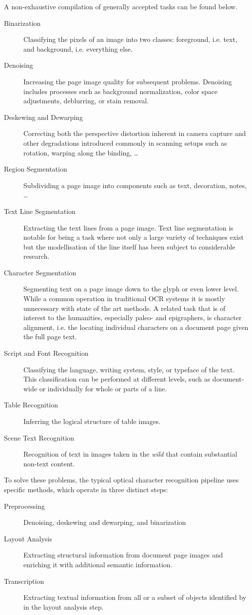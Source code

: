 A non-exhaustive compilation of generally accepted tasks can be found below.

\begin{description}
\item [Binarization] Classifying the pixels of an image into two classes:
foreground, i.e. text, and background, i.e. everything else.
\item [Denoising] Increasing the page image quality for subsequent problems.
Denoising includes processes such as background normalization, color space
adjustments, deblurring, or stain removal.
\item [Deskewing and Dewarping] Correcting both the perspective distortion
inherent in camera capture and other degradations introduced commonly in
scanning setups such as rotation, warping along the binding, \dots
\item [Region Segmentation] Subdividing a page image into components such as text, decoration, notes, \dots
\item [Text Line Segmentation] Extracting the text lines from a page image.
Text line segmentation is notable for being a task where not only a large
variety of techniques exist but the modellisation of the line itself has been
subject to considerable research.
\item [Character Segmentation] Segmenting text on a page image down to the
glyph or even lower level. While a common operation in traditional OCR systems
it is mostly unnecessary with state of the art methods. A related task that is
of interest to the humanities, especially paleo- and epigraphers, is character
alignment, i.e. the locating individual characters on a document page given the
full page text.
\item [Script and Font Recognition] Classifying the language, writing system,
style, or typeface of the text. This classification can be performed at
different levels, such as document-wide or individually for whole or parts of a
line.
\item [Table Recognition] Inferring the logical structure of table images.
\item [Scene Text Recognition] Recognition of text in images taken in the
\emph{wild} that contain substantial non-text content.
\end{description}

To solve these problems, the typical optical character recognition pipeline
uses specific methods, which operate in three distinct steps:

\begin{description}
\item [Preprocessing] Denoising, deskewing and dewarping, and binarization
\item [Layout Analysis] Extracting structural information from document page
images and enriching it with additional semantic information.
\item [Transcription] Extracting textual information from all or a subset of
objects identified by in the layout analysis step.
\end{description}

